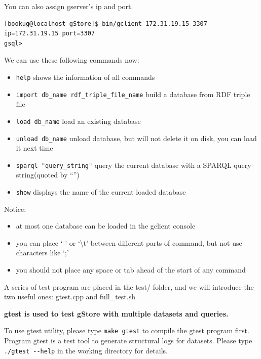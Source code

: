 \documentclass[titlepage, a4paper, 12pt]{article}
\begin{document}
You can also assign gserver's ip and port.

\begin{verbatim}
[bookug@localhost gStore]$ bin/gclient 172.31.19.15 3307
ip=172.31.19.15 port=3307
gsql>
\end{verbatim}

We can use these following commands now:

\begin{itemize}
\item
  \texttt{help} shows the information of all commands
\item
  \texttt{import\ db\_name\ rdf\_triple\_file\_name} build a database
  from RDF triple file
\item
  \texttt{load\ db\_name} load an existing database
\item
  \texttt{unload\ db\_name} unload database, but will not delete it on
  disk, you can load it next time
\item
  \texttt{sparql\ "query\_string"} query the current database with a
  SPARQL query string(quoted by ``'')
\item
  \texttt{show} displays the name of the current loaded database
\end{itemize}

Notice:

\begin{itemize}
\item
  at most one database can be loaded in the gclient console
\item
  you can place ` ' or `\textbackslash{}t' between different parts of
  command, but not use characters like `;'
\item
  you should not place any space or tab ahead of the start of any
  command
\end{itemize}


A series of test program are placed in the test/ folder, and we will
introduce the two useful ones: gtest.cpp and full\_test.sh

\textbf{gtest is used to test gStore with multiple datasets and
queries.}

To use gtest utility, please type \texttt{make\ gtest} to compile the
gtest program first. Program gtest is a test tool to generate structural
logs for datasets. Please type \texttt{./gtest\ -\/-help} in the working
directory for details.
\end{document}

